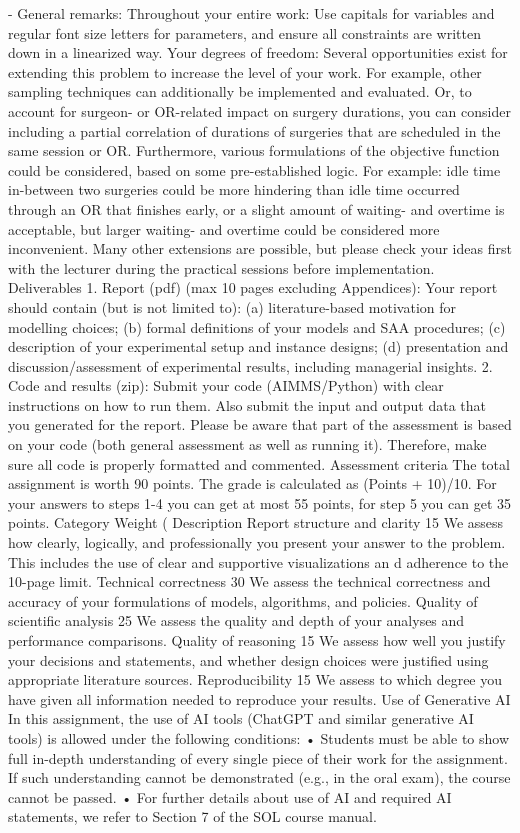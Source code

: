 - General remarks: Throughout your entire work: Use capitals for variables and regular font size letters for parameters, and ensure all constraints are written down in a linearized way.
Your degrees of freedom: Several opportunities exist for extending this problem to increase the level of your work. For example, other sampling techniques can additionally be implemented and evaluated. Or, to account for surgeon- or OR-related impact on surgery durations, you can consider including a partial correlation of durations of surgeries that are scheduled in the same session or OR. Furthermore, various formulations of the objective function could be considered, based on some pre-established logic. For example: idle time in-between two surgeries could be more hindering than idle time occurred through an OR that finishes early, or a slight amount of waiting- and overtime is acceptable, but larger waiting- and overtime could be considered more inconvenient. Many other extensions are possible, but please check your ideas first with the lecturer during the practical sessions before implementation.
Deliverables
1. Report (pdf) (max 10 pages excluding Appendices): Your report should contain (but is not limited to): (a) literature-based motivation for modelling choices; (b) formal definitions of your models and SAA procedures; (c) description of your experimental setup and instance designs; (d) presentation and discussion/assessment of experimental results, including managerial insights.
2. Code and results (zip): Submit your code (AIMMS/Python) with clear instructions on how to run them. Also submit the input and output data that you generated for the report. Please be aware that part of the assessment is based on your code (both general assessment as well as running it). Therefore, make sure all code is properly formatted and commented.
Assessment criteria
The total assignment is worth 90 points. The grade is calculated as (Points + 10)/10. For your answers to steps 1-4 you can get at most 55 points, for step 5 you can get 35 points.
Category
Weight (%
Description
Report structure and clarity
15
We assess how clearly, logically, and professionally you present your answer to the problem. This includes the use of clear and supportive visualizations an d adherence to the 10-page limit.
Technical correctness
30
We assess the technical correctness and accuracy of your formulations of models, algorithms, and policies.
Quality of scientific analysis
25
We assess the quality and depth of your analyses and performance comparisons.
Quality of reasoning
15
We assess how well you justify your decisions and statements, and whether design choices were justified using appropriate literature sources.
Reproducibility
15
We assess to which degree you have given all information needed to reproduce your results.
Use of Generative AI
In this assignment, the use of AI tools (ChatGPT and similar generative AI tools) is allowed under the following conditions:
• Students must be able to show full in-depth understanding of every single piece of their work for the assignment. If such understanding cannot be demonstrated (e.g., in the oral exam), the course cannot be passed.
• For further details about use of AI and required AI statements, we refer to Section 7 of the SOL course manual.